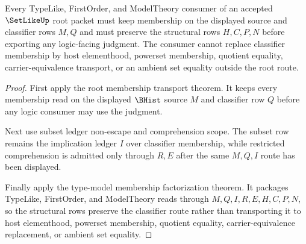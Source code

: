\begin{theorem}
\label{thm:setlike-membership-classifier-nonescape}
Every TypeLike, FirstOrder, and ModelTheory consumer of an accepted $\SetLikeUp$ root packet must keep membership on the displayed source and classifier rows $M,Q$ and must preserve the structural rows $H,C,P,N$ before exporting any logic-facing judgment. The consumer cannot replace classifier membership by host elementhood, powerset membership, quotient equality, carrier-equivalence transport, or an ambient set equality outside the root route.
\end{theorem}
\begin{proof}
First apply the root membership transport theorem. It keeps every membership read on the displayed $\BHist$ source $M$ and classifier row $Q$ before any logic consumer may use the judgment.

Next use subset ledger non-escape and comprehension scope. The subset row remains the implication ledger $I$ over classifier membership, while restricted comprehension is admitted only through $R,E$ after the same $M,Q,I$ route has been displayed.

Finally apply the type-model membership factorization theorem. It packages TypeLike, FirstOrder, and ModelTheory reads through $M,Q,I,R,E,H,C,P,N$, so the structural rows preserve the classifier route rather than transporting it to host elementhood, powerset membership, quotient equality, carrier-equivalence replacement, or ambient set equality.
\end{proof}

